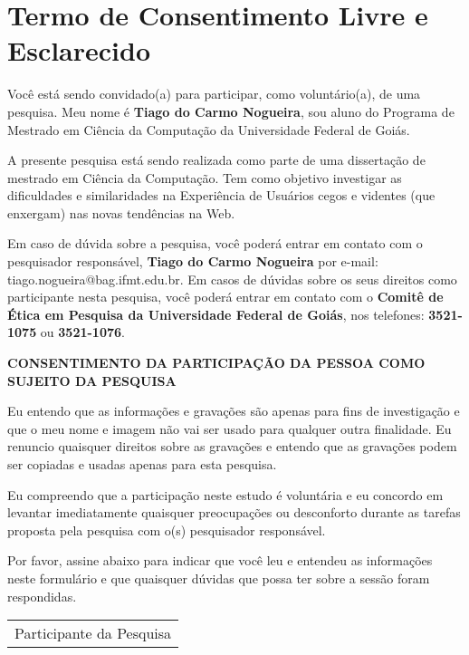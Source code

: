 \chapter{Termo de Consentimento Livre e Esclarecido}
Você está sendo convidado(a) para participar, como voluntário(a), de uma pesquisa. Meu nome é \textbf{Tiago do Carmo Nogueira}, sou aluno do Programa de Mestrado em Ciência da Computação da Universidade Federal de Goiás.

A presente pesquisa está sendo realizada como parte de uma dissertação de mestrado em Ciência da Computação. Tem como objetivo investigar as dificuldades e similaridades na Experiência de Usuários cegos e videntes (que enxergam) nas novas tendências na Web.

Em caso de dúvida sobre a pesquisa, você poderá entrar em contato com o pesquisador responsável, \textbf{Tiago do Carmo Nogueira} por e-mail: tiago.nogueira@bag.ifmt.edu.br. Em casos de dúvidas sobre os seus direitos como participante nesta pesquisa, você poderá entrar em contato com o \textbf{Comitê de Ética em Pesquisa da Universidade Federal de Goiás}, nos telefones: \textbf{3521-1075} ou \textbf{3521-1076}.

\begin{center}
\textbf{CONSENTIMENTO DA PARTICIPAÇÃO DA PESSOA COMO SUJEITO DA PESQUISA}
\end{center}

Eu entendo que as informações e gravações são apenas para fins de investigação e que o meu nome e imagem não vai ser usado para qualquer outra finalidade. Eu renuncio quaisquer direitos sobre as gravações e entendo que as gravações podem ser copiadas e usadas apenas para esta pesquisa. 

Eu compreendo que a participação neste estudo é voluntária e eu concordo em levantar imediatamente quaisquer preocupações ou desconforto durante as tarefas proposta pela pesquisa com o(s) pesquisador responsável.

Por favor, assine abaixo para indicar que você leu e entendeu as informações neste formulário e que quaisquer dúvidas que possa ter sobre a sessão foram respondidas.

\begin{center}
\begin{tabular}{p{7.2cm}}
\hline
\multicolumn{1}{c}{Participante da Pesquisa}\\
\end{tabular}
\end{center}